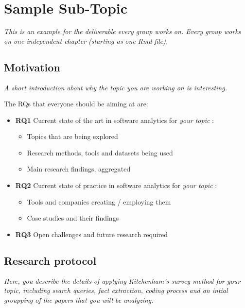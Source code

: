 \documentclass[]{book}
\providecommand{\tightlist}{%
  \setlength{\itemsep}{0pt}\setlength{\parskip}{0pt}}
\begin{document}
\chapter{Sample Sub-Topic}\label{sample-sub-topic}

\emph{This is an example for the deliverable every group works on. Every
group works on one independent chapter (starting as one Rmd file).}

\section{Motivation}\label{motivation}

\emph{A short introduction about why the topic you are working on is
interesting.}

The RQs that everyone should be aiming at are:

\begin{itemize}
\tightlist
\item
  \textbf{RQ1} Current state of the art in software analytics for
  \emph{your topic }:

  \begin{itemize}
  \tightlist
  \item
    Topics that are being explored
  \item
    Research methods, tools and datasets being used
  \item
    Main research findings, aggregated
  \end{itemize}
\item
  \textbf{RQ2} Current state of practice in software analytics for
  \emph{your topic }:

  \begin{itemize}
  \tightlist
  \item
    Tools and companies creating / employing them
  \item
    Case studies and their findings
  \end{itemize}
\item
  \textbf{RQ3} Open challenges and future research required
\end{itemize}

\section{Research protocol}\label{research-protocol}

\emph{Here, you describe the details of applying Kitchenham's survey
method for your topic, including search queries, fact extraction, coding
process and an intial groupping of the papers that you will be
analyzing.}
\end{document}
